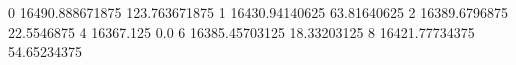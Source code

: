 0 16490.888671875 123.763671875
1 16430.94140625 63.81640625
2 16389.6796875 22.5546875
4 16367.125 0.0
6 16385.45703125 18.33203125
8 16421.77734375 54.65234375
